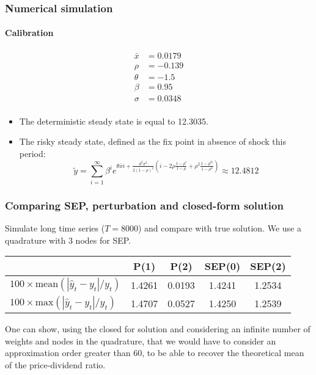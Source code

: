 \documentclass{beamer}
\begin{document}
\begin{frame}
   \frametitle{Numerical simulation}
   \framesubtitle{Calibration}

   \begin{align*}
      \bar x & = 0.0179  \\
      \rho   & =  -0.139 \\
      \theta & = -1.5    \\
      \beta  & = 0.95    \\
      \sigma & = 0.0348  \\
   \end{align*}

   \medskip

   \begin{itemize}
      \item The deterministic steady state is equal to 12.3035.\newline
      \item The risky steady state, defined as the fix point in absence of
            shock this period:
            \[
               \widetilde y = \sum_{i=1}^\infty \beta^i e^{\theta \bar x i +
                     \frac{\theta^2\sigma^2}{2(1-\rho)^2}\left(i-2\rho\frac{1-\rho^i}{1-\rho}+\rho^2\frac{1-\rho^{2i}}{1-\rho^2}\right)}\approx 12.4812
            \]

   \end{itemize}

\end{frame}

\begin{frame}
   \frametitle{Comparing SEP, perturbation and closed-form solution}

   Simulate long time series ($T=8000$) and compare with true solution. We use a quadrature with 3 nodes for SEP.\newline

   \bigskip

   \begin{tabular}{l|cc|cc}
      \hline
                                                     & P(1)   & P(2)   & SEP(0) & SEP(2) \\ \hline
      $100\times\textrm{mean}(|\hat y_t - y_t|/y_t)$ & 1.4261 & 0.0193 & 1.4241 & 1.2534 \\
      $100\times\textrm{max}(|\hat y_t - y_t|/y_t)$  & 1.4707 & 0.0527 & 1.4250 & 1.2539 \\ \hline\hline
   \end{tabular}

   \bigskip\bigskip

   One can show, using the closed for solution and considering an infinite number of weights and nodes in the quadrature, that we would have to consider an approximation order greater than 60, to be able to recover the theoretical mean of the price-dividend ratio.


\end{frame}
\end{document}
